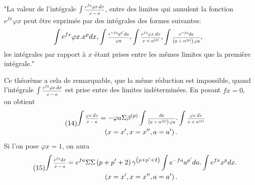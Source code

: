 \documentclass[oneside, 12 pt, leqno]{memoir}
\let\oldfrac\frac
\def\frac#1#2{\mathchoice{\text{\scalebox{.83}{${\oldfrac{#1}{#2}}$}}}{\text{\scalebox{.83}{${\displaystyle\oldfrac{#1}{#2}}$}}}{\genfrac{}{}{}{2}{#1}{#2}}{\genfrac{}{}{}{3}{#1}{#2}}}
\begin{document}
"La valeur de l'intégrale \(\int \frac{e^{f x} \varphi x. d x}{x-a}\), entre des limites qui annulent la fonction \(e^{f x} \varphi x\) peut être exprimée par des intégrales des formes suivantes:
\[\int e^{f x} \varphi x. x^p d x, \int \frac{e^{-f a} a^{p^{\prime}} d a}{\varphi a}, \int \frac{e^{f x} \varphi x. d x}{x+\alpha^{(p)}}, \int \frac{e^{-f a} d a}{\left(a+\alpha^{(p)}\right) \varphi a},\]
les intégrales par rapport à \(x\) étant prises entre les mêmes limites que la première intégrale."

Ce théorème a cela de remarquable, que la même réduction est impossible, quand l'intégrale \(\int \frac{e^{f x} \varphi x. d x}{x-a}\) est prise entre des limites indéterminées. En posant \(f x=0\), on obtient
\[\tag{14}\begin{gathered}
\int \frac{\varphi x. d x}{x-a}=-\varphi a \Sigma \beta^{(p)} \int \frac{d a}{\left(a+\alpha^{(p)}\right) \varphi a}. \int \frac{\varphi x. d x}{x+\alpha^{(p)}} \\
\left(x=x^{\prime}, x=x^{\prime \prime}, a=a^{\prime}\right).
\end{gathered}\]
Si l'on pose \(\varphi x=1\), on aura
\[\tag{15}\begin{gathered}
\int \frac{e^{f x} d x}{x-a}=e^{f a} \Sigma \Sigma\left(p+p^{\prime}+2\right) \gamma^{\left(p+p^{\prime}+2\right)} \int e^{-f a} a^{p^{\prime}} d a. \int e^{f x} x^p d x. \\
\left(x=x^{\prime}, x=x^{\prime \prime}, a=a^{\prime}\right).
\end{gathered}\]
\end{document}
